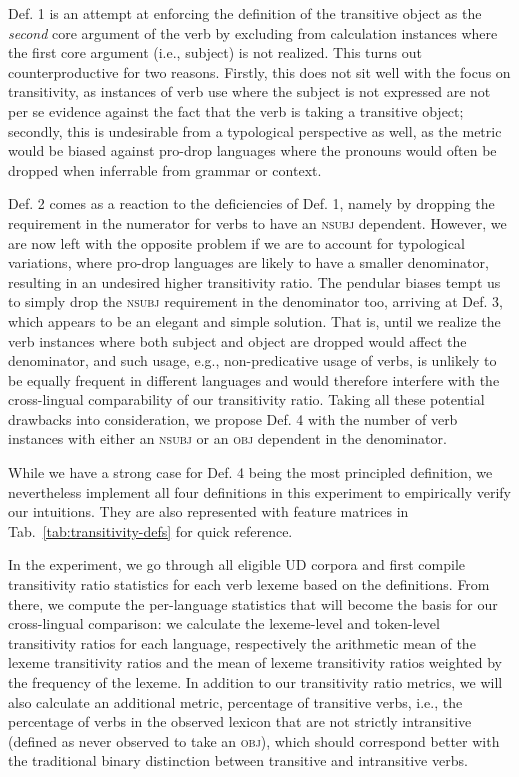 Def. 1 is an attempt at enforcing the definition of the transitive object as the \textit{second} core argument of the verb by excluding from calculation instances where the first core argument (i.e., subject) is not realized. This turns out counterproductive for two reasons. Firstly, this does not sit well with the focus on transitivity, as instances of verb use where the subject is not expressed are not per se evidence against the fact that the verb is taking a transitive object; secondly, this is undesirable from a typological perspective as well, as the metric would be biased against pro-drop languages where the pronouns would often be dropped when inferrable from grammar or context. 

Def. 2 comes as a reaction to the deficiencies of Def. 1, namely by dropping the requirement in the numerator for verbs to have an \textsc{nsubj} dependent. However, we are now left with the opposite problem if we are to account for typological variations, where pro-drop languages are likely to have a smaller denominator, resulting in an undesired higher transitivity ratio. The pendular biases tempt us to simply drop the \textsc{nsubj} requirement in the denominator too, arriving at Def. 3, which appears to be an elegant and simple solution. That is, until we realize the verb instances where both subject and object are dropped would affect the denominator, and such usage, e.g., non-predicative usage of verbs, is unlikely to be equally frequent in different languages and would therefore interfere with the cross-lingual comparability of our transitivity ratio. Taking all these potential drawbacks into consideration, we propose Def. 4 with the number of verb instances with either an \textsc{nsubj} or an \textsc{obj} dependent in the denominator. 



While we have a strong case for Def. 4 being the most principled definition, we nevertheless implement all four definitions in this experiment to empirically verify our intuitions. They are also represented with feature matrices in Tab.~\ref{tab:transitivity-defs} for quick reference.

In the experiment, we go through all eligible UD corpora and first compile transitivity ratio statistics for each verb lexeme based on the definitions. From there, we compute the per-language statistics that will become the basis for our cross-lingual comparison: we calculate the lexeme-level and token-level transitivity ratios for each language, respectively the arithmetic mean of the lexeme transitivity ratios and the mean of lexeme transitivity ratios weighted by the frequency of the lexeme. In addition to our transitivity ratio metrics, we will also calculate an additional metric, percentage of transitive verbs, i.e., the percentage of verbs in the observed lexicon that are not strictly intransitive (defined as never observed to take an \textsc{obj}), which should correspond better with the traditional binary distinction between transitive and intransitive verbs.

